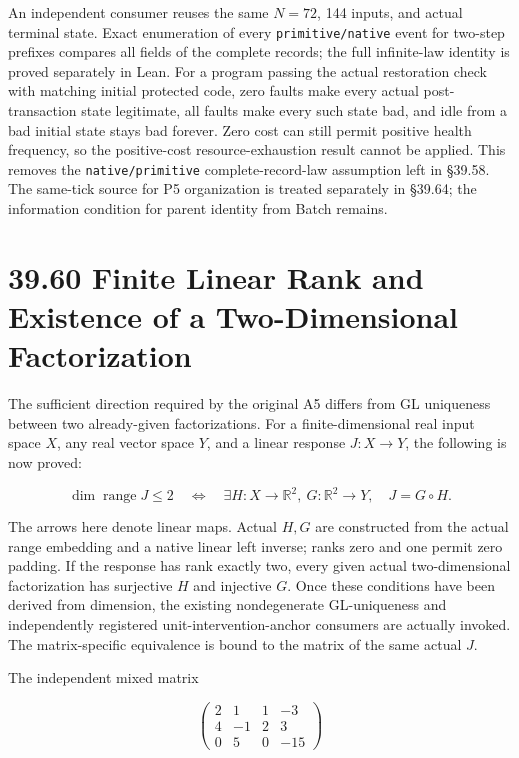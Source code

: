 \documentclass[
  english,
  11pt,
  oneside]{book}
\begin{document}
An independent consumer reuses the same \(N=72\), 144 inputs, and actual terminal state. Exact enumeration of every \nolinkurl{primitive/native} event for two-step prefixes compares all fields of the complete records; the full infinite-law identity is proved separately in Lean. For a program passing the actual restoration check with matching initial protected code, zero faults make every actual post-transaction state legitimate, all faults make every such state bad, and idle from a bad initial state stays bad forever. Zero cost can still permit positive health frequency, so the positive-cost resource-exhaustion result cannot be applied. This removes the \nolinkurl{native/primitive} complete-record-law assumption left in §39.58. The same-tick source for P5 organization is treated separately in §39.64; the information condition for parent identity from Batch remains.

\section{39.60 Finite Linear Rank and Existence of a Two-Dimensional Factorization}\label{finite-linear-rank-and-existence-of-a-two-dimensional-factorization}

The sufficient direction required by the original A5 differs from GL uniqueness between two already-given factorizations. For a finite-dimensional real input space \(X\), any real vector space \(Y\), and a linear response \(J:X\to Y\), the following is now proved:

\[\dim\operatorname{range}J\le2
\quad\Longleftrightarrow\quad
\exists H:X\to\mathbb R^2,\ G:\mathbb R^2\to Y,
\quad J=G\circ H.\]

The arrows here denote linear maps. Actual \(H,G\) are constructed from the actual range embedding and a native linear left inverse; ranks zero and one permit zero padding. If the response has rank exactly two, every given actual two-dimensional factorization has surjective \(H\) and injective \(G\). Once these conditions have been derived from dimension, the existing nondegenerate GL-uniqueness and independently registered unit-intervention-anchor consumers are actually invoked. The matrix-specific equivalence is bound to the matrix of the same actual \(J\).

The independent mixed matrix

\[\begin{pmatrix}
2&1&1&-3\\
4&-1&2&3\\
0&5&0&-15
\end{pmatrix}\]
\end{document}
